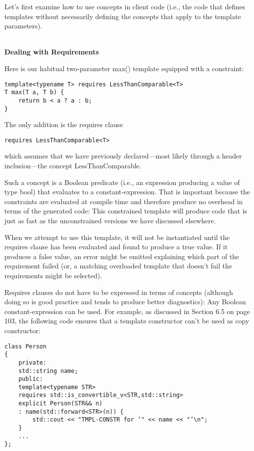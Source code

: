 
Let’s first examine how to use concepts in client code (i.e., the code that defines templates without necessarily defining the concepts that apply to the template parameters).

\hspace*{\fill} \\ %
\noindent
\textbf{Dealing with Requirements}

Here is our habitual two-parameter max() template equipped with a constraint:

\begin{lstlisting}[style=styleCXX]
template<typename T> requires LessThanComparable<T>
T max(T a, T b) {
	return b < a ? a : b;
}
\end{lstlisting}

The only addition is the requires clause

\begin{lstlisting}[style=styleCXX]
requires LessThanComparable<T>
\end{lstlisting}

which assumes that we have previously declared—most likely through a header inclusion—the concept LessThanComparable.

Such a concept is a Boolean predicate (i.e., an expression producing a value of type bool) that evaluates to a constant-expression. That is important because the constraints are evaluated at compile time and therefore produce no overhead in terms of the generated code: This constrained template will produce code that is just as fast as the unconstrained versions we have discussed elsewhere.

When we attempt to use this template, it will not be instantiated until the requires clause has been evaluated and found to produce a true value. If it produces a false value, an error might be emitted explaining which part of the requirement failed (or, a matching overloaded template that doesn’t fail the requirements might be selected).

Requires clauses do not have to be expressed in terms of concepts (although doing so is good practice and tends to produce better diagnostics): Any Boolean constant-expression can be used. For example, as discussed in Section 6.5 on page 103, the following code ensures that a template constructor can’t be used as copy constructor:

\begin{lstlisting}[style=styleCXX]
class Person
{
	private:
	std::string name;
	public:
	template<typename STR>
	requires std::is_convertible_v<STR,std::string>
	explicit Person(STR&& n)
	: name(std::forward<STR>(n)) {
		std::cout << "TMPL-CONSTR for ’" << name << "’\n";
	}
	...
};
\end{lstlisting}

